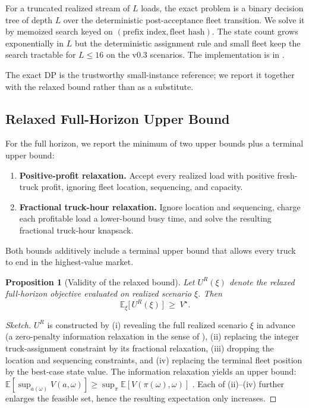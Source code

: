 \documentclass[11pt]{article}
\newtheorem{proposition}{Proposition}
\begin{document}
For a truncated realized stream of $L$ loads, the exact problem is a
binary decision tree of depth $L$ over the deterministic post-acceptance
fleet transition. We solve it by memoized search keyed on
$(\text{prefix index}, \text{fleet hash})$. The state count grows
exponentially in $L$ but the deterministic assignment rule and small
fleet keep the search tractable for $L \leq 16$ on the v0.3 scenarios.
The implementation is in .

The exact DP is the trustworthy small-instance reference; we report it
together with the relaxed bound rather than as a substitute.

\subsection{Relaxed Full-Horizon Upper Bound}

For the full horizon, we report the minimum of two upper bounds plus a
terminal upper bound:
\begin{enumerate}
  \item \textbf{Positive-profit relaxation.} Accept every realized load
  with positive fresh-truck profit, ignoring fleet location, sequencing,
  and capacity.
  \item \textbf{Fractional truck-hour relaxation.} Ignore location and
  sequencing, charge each profitable load a lower-bound busy time, and
  solve the resulting fractional truck-hour knapsack.
\end{enumerate}
Both bounds additively include a terminal upper bound that allows every
truck to end in the highest-value market.

\begin{proposition}[Validity of the relaxed bound]
\label{prop:bound}
Let $U^{R}(\xi)$ denote the relaxed full-horizon objective evaluated on
realized scenario $\xi$. Then
\begin{equation}
  \mathbb{E}_\xi \bigl[\, U^{R}(\xi)\, \bigr] \;\geq\; V^\star.
\end{equation}
\end{proposition}

\begin{proof}[Sketch]
$U^R$ is constructed by (i) revealing the full realized scenario $\xi$
in advance (a zero-penalty information relaxation in the sense of
\citet{brown2010information}), (ii) replacing the integer truck-assignment
constraint by its fractional relaxation, (iii) dropping the location and
sequencing constraints, and (iv) replacing the terminal fleet position by
the best-case state value. The information relaxation yields an upper
bound: $\mathbb{E}[\sup_{a(\omega)} V(a, \omega)] \geq \sup_\pi
\mathbb{E}[V(\pi(\omega), \omega)]$ \citep{brown2010information}. Each of
(ii)--(iv) further enlarges the feasible set, hence the resulting
expectation only increases.
\end{proof}
\end{document}
